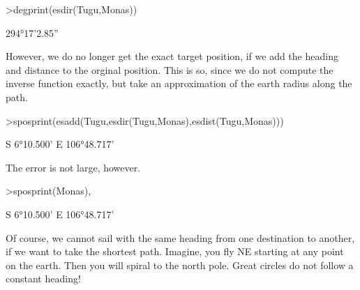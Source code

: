 \documentclass{article}
\begin{document}
\begin{eulernotebook}
\begin{eulercomment}
\begin{eulercomment}
\begin{eulercomment}
\begin{eulercomment}
\begin{eulercomment}
\begin{eulercomment}
\begin{eulercomment}
\begin{eulercomment}
\begin{eulercomment}
\end{eulercomment}
\begin{eulerprompt}
>degprint(esdir(Tugu,Monas))
\end{eulerprompt}
\begin{euleroutput}
  294°17'2.85''
\end{euleroutput}
\begin{eulercomment}
However, we do no longer get the exact target position, if we add the
heading and distance to the orginal position. This is so, since we do
not compute the inverse function exactly, but take an approximation of
the earth radius along the path.
\end{eulercomment}
\begin{eulerprompt}
>sposprint(esadd(Tugu,esdir(Tugu,Monas),esdist(Tugu,Monas)))
\end{eulerprompt}
\begin{euleroutput}
  S 6°10.500' E 106°48.717'
\end{euleroutput}
\begin{eulercomment}
The error is not large, however.
\end{eulercomment}
\begin{eulerprompt}
>sposprint(Monas),
\end{eulerprompt}
\begin{euleroutput}
  S 6°10.500' E 106°48.717'
\end{euleroutput}
\begin{eulercomment}
Of course, we cannot sail with the same heading from one destination
to another, if we want to take the shortest path. Imagine, you fly NE
starting at any point on the earth. Then you will spiral to the north
pole. Great circles do not follow a constant heading!


\end{eulercomment}
\end{eulercomment}
\end{eulercomment}
\end{eulercomment}
\end{eulercomment}
\end{eulercomment}
\end{eulercomment}
\end{eulercomment}
\end{eulercomment}
\end{eulernotebook}
\end{document}
